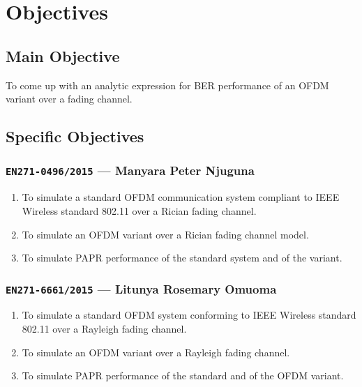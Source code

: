 \section{Objectives}
\subsection{Main Objective}
To come up with an analytic expression for \gls{BER} performance of an \gls{OFDM} variant over a fading channel.
\subsection{Specific Objectives}
\subsubsection{\texttt{EN271-0496/2015} --- Manyara Peter Njuguna}
\begin{enumerate}
	\item To simulate a standard \gls{OFDM} communication system compliant to IEEE Wireless standard 802.11 over a Rician fading channel.
	\item To simulate an OFDM variant over a Rician fading channel model.
	\item To simulate PAPR performance of the standard system and of the variant.
\end{enumerate}
\subsubsection{\texttt{EN271-6661/2015} --- Litunya Rosemary Omuoma}
\begin{enumerate}
	\item To simulate a standard OFDM system conforming to IEEE Wireless standard 802.11 over a Rayleigh fading channel.
	\item To simulate an OFDM variant over a Rayleigh fading channel.
	\item To simulate PAPR performance of the standard and of the OFDM variant.
\end{enumerate}
